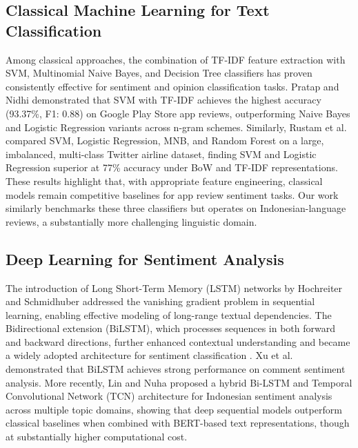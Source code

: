 \documentclass{article}
\begin{document}
\subsection{Classical Machine Learning for Text Classification}
Among classical approaches, the combination of TF-IDF feature extraction with SVM, Multinomial Naive Bayes, and Decision Tree classifiers has proven consistently effective for sentiment and opinion classification tasks. Pratap and Nidhi \cite{pratap2020comparative} demonstrated that SVM with TF-IDF achieves the highest accuracy (93.37\%, F1: 0.88) on Google Play Store app reviews, outperforming Naive Bayes and Logistic Regression variants across n-gram schemes. Similarly, Rustam et al.\ \cite{rustam2021comparative} compared SVM, Logistic Regression, MNB, and 
Random Forest on a large, imbalanced, multi-class Twitter airline dataset, finding  SVM and Logistic Regression superior at 77\% accuracy under BoW and TF-IDF representations. These results highlight that, with appropriate feature engineering, classical models remain competitive baselines for app review sentiment tasks. Our work similarly benchmarks these three classifiers but operates on Indonesian-language reviews, a substantially more challenging linguistic domain.

\subsection{Deep Learning for Sentiment Analysis}
The introduction of Long Short-Term Memory (LSTM) networks by Hochreiter and Schmidhuber \cite{hochreiter1997lstm} addressed the vanishing gradient problem in sequential learning, enabling effective modeling of long-range textual dependencies. The Bidirectional extension (BiLSTM), which processes sequences in both forward and backward directions, further enhanced contextual understanding and became a widely adopted architecture for sentiment classification \cite{xu2019bilstm}. Xu et al. \cite{xu2019bilstm} demonstrated that BiLSTM achieves strong performance on comment sentiment analysis. More recently, Lin and Nuha \cite{lin2023hybrid} proposed a hybrid Bi-LSTM and Temporal Convolutional Network (TCN) architecture for Indonesian sentiment analysis across multiple topic domains, showing that deep sequential models outperform classical baselines when combined with BERT-based text representations, though at substantially higher computational cost.
\end{document}
